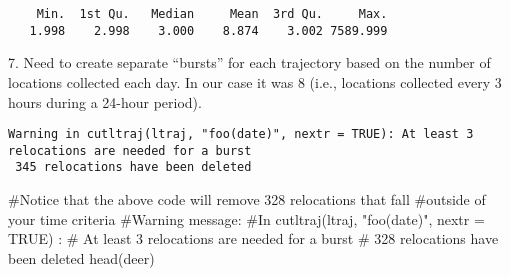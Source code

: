 \documentclass[
  letterpaper,
]{book}
\newenvironment{Shaded}{\begin{snugshade}}{\end{snugshade}}
\newcommand{\AttributeTok}[1]{\textcolor[rgb]{0.40,0.45,0.13}{#1}}
\newcommand{\CommentTok}[1]{\textcolor[rgb]{0.37,0.37,0.37}{#1}}
\newcommand{\ConstantTok}[1]{\textcolor[rgb]{0.56,0.35,0.01}{#1}}
\newcommand{\ControlFlowTok}[1]{\textcolor[rgb]{0.00,0.23,0.31}{#1}}
\newcommand{\FloatTok}[1]{\textcolor[rgb]{0.68,0.00,0.00}{#1}}
\newcommand{\FunctionTok}[1]{\textcolor[rgb]{0.28,0.35,0.67}{#1}}
\newcommand{\NormalTok}[1]{\textcolor[rgb]{0.00,0.23,0.31}{#1}}
\newcommand{\OtherTok}[1]{\textcolor[rgb]{0.00,0.23,0.31}{#1}}
\newcommand{\SpecialCharTok}[1]{\textcolor[rgb]{0.37,0.37,0.37}{#1}}
\newcommand{\StringTok}[1]{\textcolor[rgb]{0.13,0.47,0.30}{#1}}
\begin{document}
\begin{verbatim}
    Min.  1st Qu.   Median     Mean  3rd Qu.     Max. 
   1.998    2.998    3.000    8.874    3.002 7589.999 
\end{verbatim}

7. Need to create separate ``bursts'' for each trajectory based on the
number of locations collected each day. In our case it was 8 (i.e.,
locations collected every 3 hours during a 24-hour period).

\begin{Shaded}
\end{Shaded}

\begin{verbatim}
Warning in cutltraj(ltraj, "foo(date)", nextr = TRUE): At least 3 relocations are needed for a burst
 345 relocations have been deleted
\end{verbatim}

\begin{Shaded}
\begin{Highlighting}[]
\CommentTok{\#Notice that the above code will remove 328 relocations that fall}
\CommentTok{\#outside of your time criteria}
\CommentTok{\#Warning message:}
\CommentTok{\#In cutltraj(ltraj, "foo(date)", nextr = TRUE) :}
\CommentTok{\#  At least 3 relocations are needed for a burst}
\CommentTok{\# 328 relocations have been deleted}
\FunctionTok{head}\NormalTok{(deer)}
\end{Highlighting}
\end{Shaded}
\end{document}
